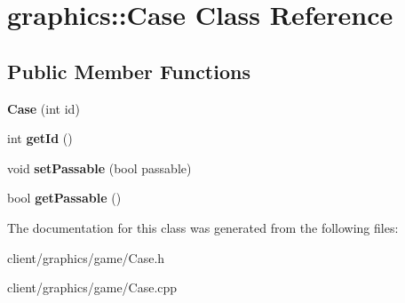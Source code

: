 \hypertarget{classgraphics_1_1_case}{\section{graphics\-:\-:Case Class Reference}
\label{classgraphics_1_1_case}
}
\subsection*{Public Member Functions}
\begin{DoxyCompactItemize}
\item 
\hypertarget{classgraphics_1_1_case_a5600929a75f0f5f602c8f171f06b2b0e}{{\bfseries Case} (int id)}\label{classgraphics_1_1_case_a5600929a75f0f5f602c8f171f06b2b0e}

\item 
\hypertarget{classgraphics_1_1_case_aedec9150d905cbedad7c2e5d2b7d33d9}{int {\bfseries get\-Id} ()}\label{classgraphics_1_1_case_aedec9150d905cbedad7c2e5d2b7d33d9}

\item 
\hypertarget{classgraphics_1_1_case_a1b7b7e3fc9f5d11bd1a193744f4a937f}{void {\bfseries set\-Passable} (bool passable)}\label{classgraphics_1_1_case_a1b7b7e3fc9f5d11bd1a193744f4a937f}

\item 
\hypertarget{classgraphics_1_1_case_a0acff970b0b92fdf4be11b88c395abde}{bool {\bfseries get\-Passable} ()}\label{classgraphics_1_1_case_a0acff970b0b92fdf4be11b88c395abde}

\end{DoxyCompactItemize}


The documentation for this class was generated from the following files\-:\begin{DoxyCompactItemize}
\item 
client/graphics/game/Case.\-h\item 
client/graphics/game/Case.\-cpp\end{DoxyCompactItemize}

